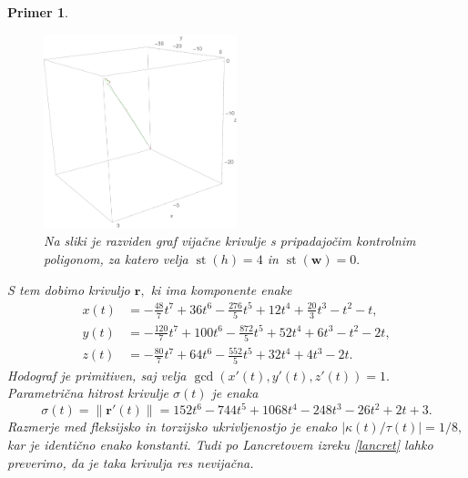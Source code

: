 \documentclass[12pt,a4paper,twoside]{article}
\theoremstyle{definition} %
\theoremstyle{plain} %
\theoremstyle{primerstyle}
\newtheorem{primer}[definicija]{Primer}
\numberwithin{equation}{section}  %
\newcommand{\rV}{\mathbf{r}}
\newcommand{\wV}{\mathbf{w}}
\DeclareMathOperator{\st}{st}
\begin{document}
\begin{primer}
\begin{figure}[h]
	  \includegraphics[width=0.5\textwidth]{images/h4w0_vijacna.pdf}
	  \caption[Primer vijačne krivulje.]{Na sliki je razviden graf vijačne krivulje s pripadajočim kontrolnim poligonom, za katero velja $\st(h)=4$ in $\st(\wV)=0.$}
	  \label{fig:h4w0_vijacna}
	\end{figure}
	
	S tem dobimo krivuljo $\rV,$ ki ima komponente enake
	\begin{align*}
		x(t)&=-\frac{48}{7}t^7+36t^6-\frac{276}{5}t^5+12t^4+\frac{20}{3}t^3-t^2-t,\\
		y(t)&=-\frac{120}{7}t^7+100t^6-\frac{872}{5}t^5+52t^4+6t^3-t^2-2t,\\
		z(t)&=-\frac{80}{7}t^7+64t^6-\frac{552}{5}t^5+32t^4+4t^3-2t.
	\end{align*}
	Hodograf je primitiven, saj velja $\gcd(x'(t),y'(t),z'(t))=1.$ Parametrična hitrost krivulje $\sigma(t)$ je enaka
	\begin{equation*}
		\sigma(t)=\lVert\rV'(t)\rVert=152t^6-744t^5+1068t^4-248t^3-26t^2+2t+3.
	\end{equation*}
	Razmerje med fleksijsko in torzijsko ukrivljenostjo je enako $|\kappa(t)/\tau(t)|=1/8,$ kar je identično enako konstanti. Tudi po Lancretovem izreku \ref{lancret} lahko preverimo, da je taka krivulja res nevijačna.
\end{primer}
\end{document}

